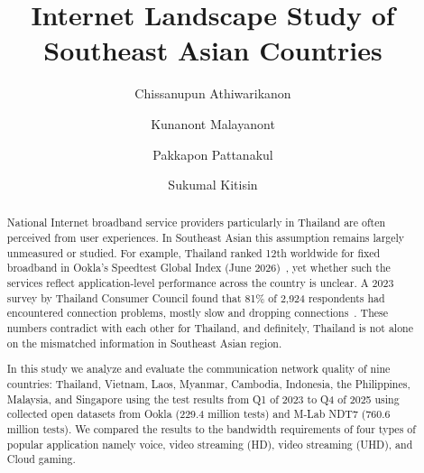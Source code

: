 \documentclass[sigconf,nonacm]{acmart}
\begin{document}
\title{Internet Landscape Study of Southeast Asian Countries}

\author{Chissanupun Athiwarikanon}
\author{Kunanont Malayanont}
\author{Pakkapon Pattanakul}
\author{Sukumal Kitisin}

\renewcommand{\shortauthors}{Athiwarikanon et al.}

\begin{abstract}
National Internet broadband service providers particularly in Thailand are
often perceived from user experiences. In Southeast Asian this assumption
remains largely unmeasured or studied. For example, Thailand ranked 12th
worldwide for fixed broadband in Ookla's Speedtest Global Index (June
2026)~\cite{OoklaGlobalIndex2026}, yet whether such the services reflect
application-level performance across the country is unclear. A 2023 survey
by Thailand Consumer Council found that 81\% of 2,924 respondents had
encountered connection problems, mostly slow and dropping
connections~\cite{TCC2023}. These numbers contradict with each other for
Thailand, and definitely, Thailand is not alone on the mismatched
information in Southeast Asian region.

In this study we analyze and evaluate the communication network quality of
nine countries: Thailand, Vietnam, Laos, Myanmar, Cambodia, Indonesia, the
Philippines, Malaysia, and Singapore using the test results from Q1 of
2023 to Q4 of 2025 using collected open datasets from Ookla (229.4 million
tests) and M-Lab NDT7 (760.6 million tests). We compared the results to the
bandwidth requirements of four types of popular application namely voice,
video streaming (HD), video streaming (UHD), and Cloud gaming.
\end{abstract}


\maketitle
\end{document}
